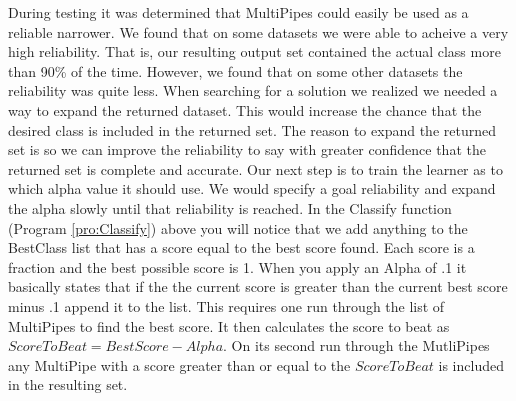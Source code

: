 During testing it was determined that MultiPipes could easily be used 
as a reliable narrower. We found that on some datasets we were 
able to acheive a very high reliability. That is, our resulting output 
set contained the actual class more than 90\% of the time. However, we
found that on some other datasets the reliability was quite less. 
When searching for a solution we realized we needed a way to expand 
the returned dataset. This would increase the chance that the desired 
class is included in the returned set. The reason to expand the 
returned set is so we can improve the reliability to say with greater
confidence that the returned set is complete and accurate. Our next 
step is to train the learner as to which alpha value it should use. 
We would specify a goal reliability and expand the alpha slowly until 
that reliability is reached. In the Classify function (Program \ref{pro:Classify}) above you will 
notice that we add anything to the BestClass list that has a score 
equal to the best score found. Each score is a fraction and the best 
possible score is 1. When you apply an Alpha of .1 it basically 
states that if the the current score is greater than the current best 
score minus .1 append it to the list. This requires one run through the 
list of MultiPipes to find the best score. It then calculates the score 
to beat as \begin{math}ScoreToBeat = BestScore - Alpha\end{math}. On its second run through the 
MutliPipes any MultiPipe with a score greater than or equal to the 
\begin{math}ScoreToBeat\end{math} is included in the resulting set. 

